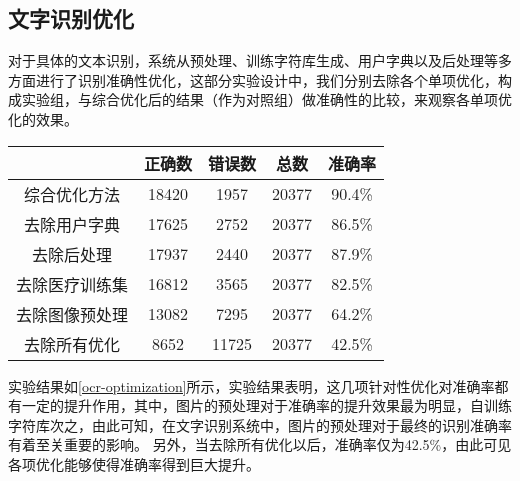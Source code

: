 \subsection{文字识别优化}
对于具体的文本识别，系统从预处理、训练字符库生成、用户字典以及后处理等多方面进行了识别准确性优化，这部分实验设计中，我们分别去除各个单项优化，构成实验组，与综合优化后的结果（作为对照组）做准确性的比较，来观察各单项优化的效果。
\begin{table}[!htbp]
	\label{ocr-optimization}
	\centering
	\vspace{10pt}
  \renewcommand\arraystretch{1.5}  %
	\begin{tabular}{c||c|c|c|c}
    \hline
    & 正确数 & 错误数 & 总数 & 准确率 \\
		\hline
    综合优化方法 & 18420 & 1957 & 20377 & 90.4\% \\
		\hline
    去除用户字典 & 17625 & 2752 & 20377 & 86.5\% \\
		\hline
    去除后处理 & 17937 & 2440 & 20377 & 87.9\% \\
		\hline
    去除医疗训练集 & 16812 & 3565 & 20377 & 82.5\% \\
		\hline
    去除图像预处理 & 13082 & 7295 & 20377 & 64.2\% \\
		\hline
    去除所有优化 & 8652 & 11725 & 20377 & 42.5\% \\
    \hline
	\end{tabular}
\end{table}
实验结果如\autoref{ocr-optimization}所示，实验结果表明，这几项针对性优化对准确率都有一定的提升作用，其中，图片的预处理对于准确率的提升效果最为明显，自训练字符库次之，由此可知，在文字识别系统中，图片的预处理对于最终的识别准确率有着至关重要的影响。
另外，当去除所有优化以后，准确率仅为42.5\%，由此可见各项优化能够使得准确率得到巨大提升。

